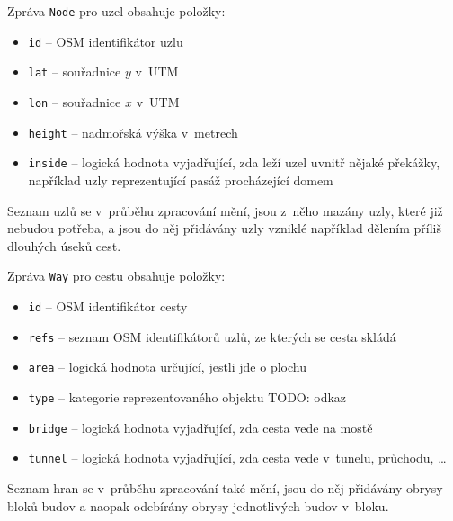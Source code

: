 Zpráva \verb|Node| pro uzel obsahuje položky:
\begin{itemize}
	\item \verb|id| -- OSM identifikátor uzlu
	\item \verb|lat| -- souřadnice $y$ v~UTM
	\item \verb|lon| -- souřadnice $x$ v~UTM
	\item \verb|height| -- nadmořská výška v~metrech
	\item \verb|inside| -- logická hodnota vyjadřující, zda leží uzel uvnitř
	nějaké překážky, například uzly reprezentující pasáž procházející domem
\end{itemize}
Seznam uzlů se v~průběhu zpracování mění, jsou z~něho mazány uzly, které již
nebudou potřeba, a jsou do něj přidávány uzly vzniklé například dělením příliš
dlouhých úseků cest.

Zpráva \verb|Way| pro cestu obsahuje položky:
\begin{itemize}
	\item \verb|id| -- OSM identifikátor cesty
	\item \verb|refs| -- seznam OSM identifikátorů uzlů, ze kterých se cesta
	skládá
	\item \verb|area| -- logická hodnota určující, jestli jde o plochu
	\item \verb|type| -- kategorie reprezentovaného objektu TODO: odkaz
	\item \verb|bridge| -- logická hodnota vyjadřující, zda cesta vede na mostě
	\item \verb|tunnel| -- logická hodnota vyjadřující, zda cesta vede
v~tunelu, průchodu, \dots
\end{itemize}
Seznam hran se v~průběhu zpracování také mění, jsou do něj přidávány obrysy
bloků budov a naopak odebírány obrysy jednotlivých budov v~bloku.


